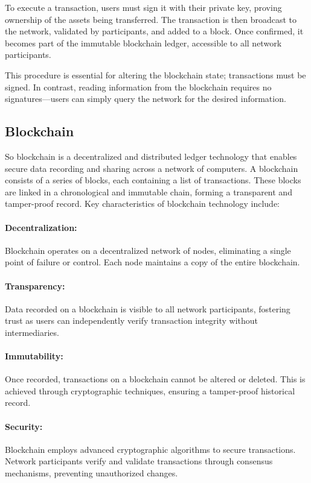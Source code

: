 To execute a transaction, users must sign it with their private key, proving
ownership of the assets being transferred. The transaction is then broadcast to
the network, validated by participants, and added to a block. Once confirmed,
it becomes part of the immutable blockchain ledger, accessible to all network
participants.

This procedure is essential for altering the blockchain state; transactions
must be signed. In contrast, reading information from the blockchain requires
no signatures—users can simply query the network for the desired information.

\subsection{Blockchain}
\label{subsec:blockchain}

So blockchain is a decentralized and distributed ledger technology that enables
secure data recording and sharing across a network of computers. A blockchain
consists of a series of blocks, each containing a list of transactions. These
blocks are linked in a chronological and immutable chain, forming a transparent
and tamper-proof record. Key characteristics of blockchain technology include:

\paragraph{Decentralization:}
Blockchain operates on a decentralized network of nodes, eliminating a single
point of failure or control. Each node maintains a copy of the entire
blockchain.

\paragraph{Transparency:}
Data recorded on a blockchain is visible to all network participants, fostering
trust as users can independently verify transaction integrity without
intermediaries.

\paragraph{Immutability:}
Once recorded, transactions on a blockchain cannot be altered or deleted. This
is achieved through cryptographic techniques, ensuring a tamper-proof
historical record.

\paragraph{Security:}
Blockchain employs advanced cryptographic algorithms to secure transactions.
Network participants verify and validate transactions through consensus
mechanisms, preventing unauthorized changes.

